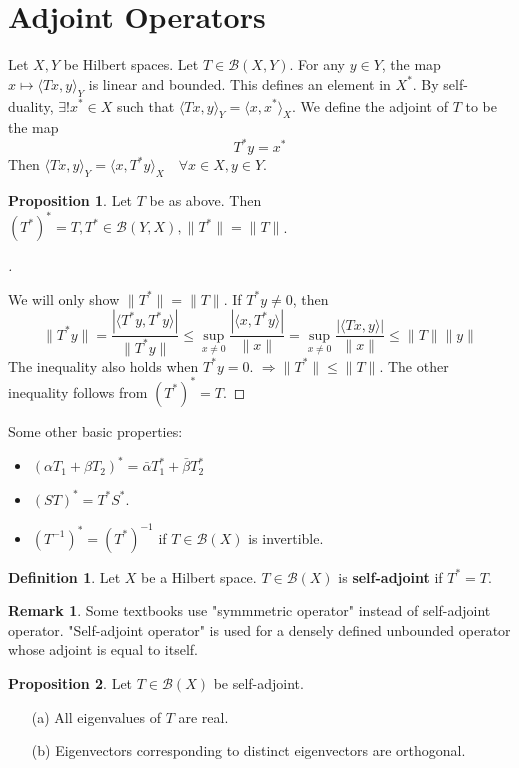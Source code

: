 \documentclass{article}
\theoremstyle{definition}
\newtheorem{dfn}{Definition}
\newtheorem{rem}{Remark}
\newtheorem{prop}{Proposition}
\newenvironment{proofs}[1][\proofname]{%
  \begin{proof}[#1]$ $\par\nobreak\ignorespaces
}{%
  \end{proof}
}
\newcommand{\B}{\mathcal B}
\begin{document}
\section{Adjoint Operators}

Let $X, Y$ be Hilbert spaces.
Let $T \in \B(X, Y)$.
For any $y \in Y$, the map $x \mapsto \langle T x, y \rangle_{Y}$ is linear and bounded.
This defines an element in $X^*$.
By self-duality, $\exists ! x^* \in X$ such that $\langle T x, y \rangle_Y = \langle x, x^* \rangle_X$.
We define the adjoint of $T$ to be the map
\[
	T^* y = x^*
\]
Then $\langle T x, y \rangle_Y = \langle x, T^* y \rangle_X \quad \forall x \in X, y \in Y$.

\begin{prop}
	Let $T$ be as above. 
	Then $(T^*)^* = T, T^* \in \B(Y, X), \|T^*\| = \|T\|$.
\end{prop}

\begin{proofs}
	We will only show $\|T^*\| = \|T\|$.
	If $T^* y \neq 0$, then
	\[
		\|T^* y \| = \frac{|\langle T^* y, T^* y \rangle|}{\|T^* y\|} \leq \sup_{x \neq 0} \frac{|\langle x, T^* y \rangle|}{\|x\|} = \sup_{x \neq 0} \frac{|\langle T x, y \rangle |}{\|x\|} \leq \|T\| \|y\|
	\]
	The inequality also holds when $T^* y = 0$.
	$\Rightarrow \|T^*\| \leq \|T\|$.
	The other inequality follows from $(T^*)^* = T$.
\end{proofs}

Some other basic properties:
\begin{itemize}
	\item $(\alpha T_1 + \beta T_2)^* = \bar{\alpha} T_1^* + \bar{\beta} T_2^*$

	\item $(ST)^* = T^* S^*$.

	\item $(T^{-1})^* = (T^*)^{-1}$ if $T \in \B (X)$ is invertible.
\end{itemize}

\begin{dfn}
	Let $X$ be a Hilbert space.
	$T \in \B(X)$ is \textbf{self-adjoint} if $T^* = T$.
\end{dfn}

\begin{rem}
	Some textbooks use "symmmetric operator" instead of self-adjoint operator.
	"Self-adjoint operator" is used for a densely defined unbounded operator whose adjoint is equal to itself.
\end{rem}

\begin{prop}
	Let $T \in \B(X)$ be self-adjoint.
	\begin{enumerate}
		\item[(a)] All eigenvalues of $T$ are real.

		\item[(b)] Eigenvectors corresponding to distinct eigenvectors are orthogonal.
	\end{enumerate}
\end{prop}
\end{document}
